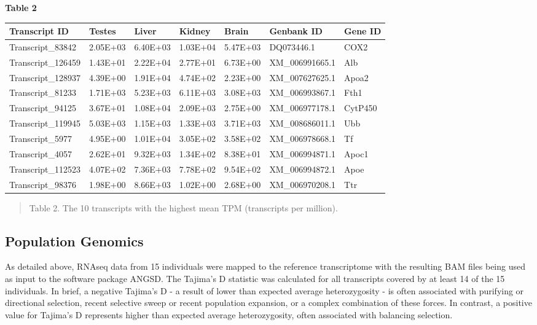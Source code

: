 \documentclass[12pt]{article}
\begin{document}
\textbf{\hypertarget{Table 2}{Table 2}} \\
\begin{center}
\begin{adjustwidth}{-.05in}{-.05in}%
\begin{tabular}{ l l l l l l l}
\textbf{Transcript ID}	&	\textbf{Testes}	&	\textbf{Liver}	&	\textbf{Kidney}	&	\textbf{Brain}	&	\textbf{Genbank ID}	&	\textbf{Gene ID}	\\
\hline
Transcript\_83842	&	2.05E+03	&	6.40E+03	&	1.03E+04	&	5.47E+03	&	DQ073446.1	&	COX2	\\
Transcript\_126459	&	1.43E+01	&	2.22E+04	&	2.77E+01	&	6.73E+00	&	XM\_006991665.1	&	Alb	\\
Transcript\_128937	&	4.39E+00	&	1.91E+04	&	4.74E+02	&	2.23E+00	&	XM\_007627625.1	&	Apoa2	\\
Transcript\_81233	&	1.71E+03	&	5.23E+03	&	6.11E+03	&	3.08E+03	&	XM\_006993867.1	&	Fth1	\\
Transcript\_94125	&	3.67E+01	&	1.08E+04	&	2.09E+03	&	2.75E+00	&	XM\_006977178.1	&	CytP450	\\
Transcript\_119945	&	5.03E+03	&	1.15E+03	&	1.33E+03	&	3.71E+03	&	XM\_008686011.1	&	Ubb	\\
Transcript\_5977	&	4.95E+00	&	1.01E+04	&	3.05E+02	&	3.58E+02	&	XM\_006978668.1	&	Tf	\\
Transcript\_4057	&	2.62E+01	&	9.32E+03	&	1.34E+02	&	8.38E+01	&	XM\_006994871.1	&	Apoc1	\\
Transcript\_112523	&	4.07E+02	&	7.36E+03	&	7.78E+02	&	9.54E+02	&	XM\_006994872.1	&	Apoe	\\
Transcript\_98376	&	1.98E+00	&	8.66E+03	&	1.02E+00	&	2.68E+00	&	XM\_006970208.1	&	Ttr	\\
\end{tabular}
\end{adjustwidth}
\end{center}
\begin{quote}
\small{Table 2. The 10 transcripts with the highest mean TPM (transcripts per million).}
\end{quote}  



\subsection*{Population Genomics}

As detailed above, RNAseq data from 15 individuals were mapped to the reference transcriptome with the resulting BAM files being used as input to the software package ANGSD. The Tajima's D statistic was calculated for all  transcripts covered by at least 14 of the 15 individuals. In brief, a negative Tajima's D - a result of lower than expected average heterozygosity - is often associated with purifying or directional selection, recent selective sweep or recent population expansion, or a complex combination of these forces. In contrast, a positive value for Tajima's D represents higher than expected average heterozygosity, often associated with balancing selection. \\ 
\end{document}

